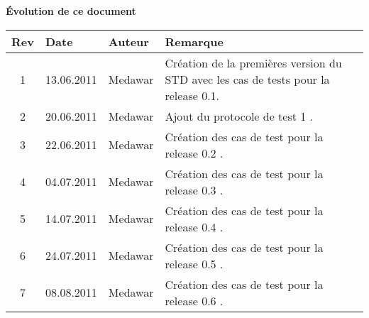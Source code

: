 \begin{large}
\textbf{Évolution de ce  document\\}
\end{large}
\begin{tabular}{|c|l|l|p{10cm}|}
\hline  Rev &  Date &  Auteur & Remarque \\ 
\hline  1 &  13.06.2011 & Medawar  & Création de la premières version du STD avec les cas de tests pour la release 0.1. \\ 
\hline  2 &  20.06.2011 & Medawar  & Ajout du protocole de test 1 . \\ 
\hline  3 &  22.06.2011 & Medawar  & Création des cas de test pour la release 0.2 . \\ 
\hline  4 &  04.07.2011 & Medawar  & Création des cas de test pour la release 0.3 . \\ 
\hline  5 &  14.07.2011 & Medawar  & Création des cas de test pour la release 0.4 . \\ 
\hline  6 &  24.07.2011 & Medawar  & Création des cas de test pour la release 0.5 . \\ 
\hline  7 &  08.08.2011 & Medawar  & Création des cas de test pour la release 0.6 . \\ 
\hline 
\end{tabular} 